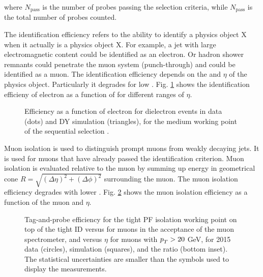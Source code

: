 \begin{description}
where $N_{\text{pass}}$ is the number of probes passing the selection criteria, while $N_{\text{pass}}$ is the total number of probes counted.

The identification efficiency refers to the ability to identify a physics object X when it actually is a physics object X. For example, a jet with large electromagnetic content could be identified as an electron. Or hadron shower remnants could penetrate the muon system (punch-through) and could be identified as a muon. The identification efficiency depends on the \pt and $\eta$ of the physics object. Particularly it degrades for low \pt. Fig. \ref{fig:CMS-EGM-13-001_Figure_024} shows the identification efficieny of electron as a function of \pt for different ranges of $\eta$.

\begin{figure}[htp]
\centering
  \def\twidth{0.45}
  \centering
\caption{Efficiency as a function of electron \pt for dielectron events in data (dots) and DY simulation (triangles), for the medium working point of the sequential selection \cite{Khachatryan:2015hwa}.}
\label{fig:CMS-EGM-13-001_Figure_024}
\end{figure}

Muon isolation is used to distinguish prompt muons from weakly decaying jets. It is used for muons that have already passed the identification criterion. Muon isolation is evaluated relative to the muon \pt by summing up energy in geometrical cone $R=\sqrt{(\Delta\eta)^{2} + (\Delta\phi)^{2}}$ surrounding the muon. The muon isolation efficiency degrades with lower \pt. Fig. \ref{fig:CMS-MUO-16-001_Figure_008} shows the muon isolation efficiency as a function of the muon \pt and $\eta$. 

\begin{figure}[htp]
\centering
  \def\twidth{0.45}
  \centering
\caption{Tag-and-probe efficiency for the tight PF isolation working point on top of the tight ID versus \pt for muons in the acceptance of the muon spectrometer, and versus $\eta$ for muons with $p_{T}^{}> 20$ GeV, for 2015 data (circles), simulation (squares), and the ratio (bottom inset). The statistical uncertainties are smaller than the symbols used to display the measurements.  \cite{Sirunyan:2018fpa}}
\label{fig:CMS-MUO-16-001_Figure_008}
\end{figure}


\end{description}
